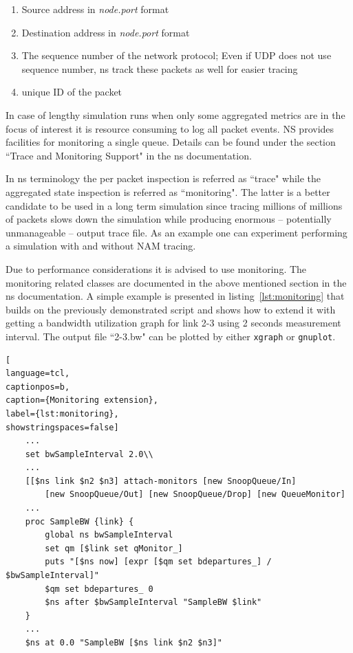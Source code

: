 \documentclass[a4paper]{article}
\begin{document}
\begin{enumerate}
    \item Source address in \emph{node.port} format

    \item Destination address in \emph{node.port} format

    \item The sequence number of the network protocol; Even if UDP does not use sequence number, ns track these packets
          as
          well for easier tracing

    \item unique ID of the packet

\end{enumerate}

In case of lengthy simulation runs when only some aggregated metrics are in the focus of interest it is resource
consuming to log all packet events. NS provides facilities for monitoring a single queue. Details can be found under
the section ``Trace and Monitoring Support" in the ns documentation.

In ns terminology the per packet inspection is referred as ``trace" while the aggregated state inspection is referred
as ``monitoring". The latter is a better candidate to be used in a long term simulation since tracing millions of
millions of packets slows down the simulation while producing enormous -- potentially unmanageable -- output trace
file. As an example one can experiment performing a simulation with and without NAM tracing.

Due to performance considerations it is advised to use monitoring. The monitoring related classes are documented in the
above mentioned section in the ns documentation. A simple example is presented in listing~\ref{lst:monitoring} that
builds on the previously demonstrated script and shows how to extend it with getting a bandwidth utilization graph for link
2-3 using 2 seconds measurement interval. The output file ``2-3.bw" can be plotted by either \verb!xgraph! or
\verb!gnuplot!.

\begin{lstlisting}[
language=tcl,
captionpos=b,
caption={Monitoring extension},
label={lst:monitoring},
showstringspaces=false]
    ...
    set bwSampleInterval 2.0\\
    ...
    [[$ns link $n2 $n3] attach-monitors [new SnoopQueue/In]
        [new SnoopQueue/Out] [new SnoopQueue/Drop] [new QueueMonitor]
    ...
    proc SampleBW {link} {
        global ns bwSampleInterval
        set qm [$link set qMonitor_]
        puts "[$ns now] [expr [$qm set bdepartures_] / $bwSampleInterval]"
        $qm set bdepartures_ 0
        $ns after $bwSampleInterval "SampleBW $link"
    }
    ...
    $ns at 0.0 "SampleBW [$ns link $n2 $n3]"
\end{lstlisting}
\end{document}
